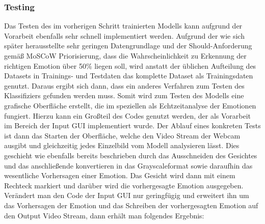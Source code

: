\documentclass[12pt, a4paper]{scrbook}
\begin{document}
\subsubsection{Testing}
Das Testen des im vorherigen Schritt trainierten Modells kann aufgrund der Vorarbeit ebenfalls sehr schnell implementiert werden. Aufgrund der wie sich später herausstellte sehr geringen Datengrundlage und der Should-Anforderung gemäß MoSCoW Priorisierung, dass die Wahrscheinlichkeit zu Erkennung der richtigen Emotion über 50\% liegen soll, wird anstatt der üblichen Aufteilung des Datasets in Trainings- und Testdaten das komplette Dataset als Trainingsdaten genutzt. Daraus ergibt sich dann, dass ein anderes Verfahren zum Testen des Klassifiziers gefunden werden muss. Somit wird zum Testen des Modells eine grafische Oberfläche erstellt, die im speziellen als Echtzeitanalyse der Emotionen fungiert. Hierzu kann ein Großteil des Codes genutzt werden, der als Vorarbeit im Bereich der Input GUI implementiert wurde. Der Ablauf eines konkreten Tests ist dann das Starten der Oberfläche, welche den Video Stream der Webcam ausgibt und gleichzeitig jedes Einzelbild vom Modell analysieren lässt. Dies geschieht wie ebenfalls bereits beschrieben durch das Ausschneiden des Gesichtes und das anschließende konvertieren in das Grayscaleformat sowie daraufhin das wesentliche Vorhersagen einer Emotion. Das Gesicht wird dann mit einem Rechteck markiert und darüber wird die vorhergesagte Emotion ausgegeben. Verändert man den Code der Input GUI nur geringfügig und erweitert ihn um das Vorhersagen der Emotion und das Schreiben der vorhergesagten Emotion auf den Output Video Stream, dann erhält man folgendes Ergebnis:

\end{document}
